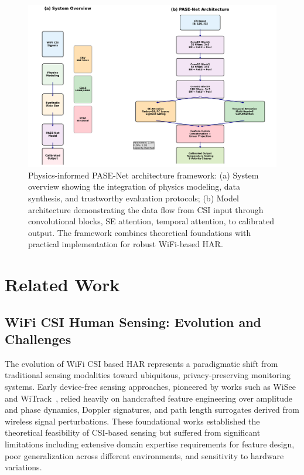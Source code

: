 \documentclass[lettersize,journal]{IEEEtran}
\begin{document}
\begin{figure}[t]
\centering
\includegraphics[width=\linewidth]{plots/fig1_system_architecture.pdf}
\caption{Physics-informed PASE-Net architecture framework: (a) System overview showing the integration of physics modeling, data synthesis, and trustworthy evaluation protocols; (b) Model architecture demonstrating the data flow from CSI input through convolutional blocks, SE attention, temporal attention, to calibrated output. The framework combines theoretical foundations with practical implementation for robust WiFi-based HAR.}
\label{fig:system_architecture}
\end{figure}

\section{Related Work}

\subsection{WiFi CSI Human Sensing: Evolution and Challenges}

The evolution of WiFi CSI based HAR represents a paradigmatic shift from traditional sensing modalities toward ubiquitous, privacy-preserving monitoring systems. Early device-free sensing approaches, pioneered by works such as WiSee~\cite{pu2013whole} and WiTrack~\cite{adib2013see}, relied heavily on handcrafted feature engineering over amplitude and phase dynamics, Doppler signatures, and path length surrogates derived from wireless signal perturbations. These foundational works established the theoretical feasibility of CSI-based sensing but suffered from significant limitations including extensive domain expertise requirements for feature design, poor generalization across different environments, and sensitivity to hardware variations.
\end{document}
